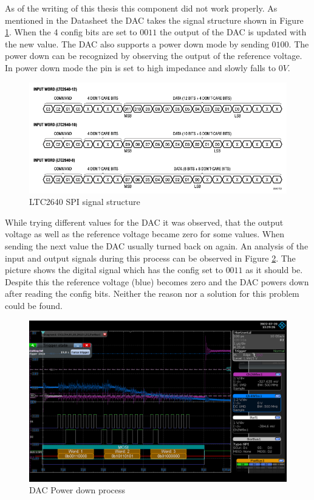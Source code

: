As of the writing of this thesis this component did not work properly. As mentioned in the Datasheet the DAC takes the signal structure shown in Figure \ref{fig:meas:circ:dac_spi}. When the 4 config bits are set to $0011$ the output of the DAC is updated with the new value. The DAC also supports a power down mode by sending $0100$. The power down can be recognized by observing the output of the reference voltage. In power down mode the pin is set to high impedance and slowly falls to $0V$.\cite{linear_technology_ltc2640_2017}
%
\begin{figure}
  \centering
  \includegraphics[width=\textwidth]{src/assets/pictures/measurements/dac_bit_structure.png}
  \caption{LTC2640 SPI signal structure\cite{linear_technology_ltc2640_2017}}\label{fig:meas:circ:dac_spi}
\end{figure}
\p
While trying different values for the DAC it was observed, that the output voltage as well as the reference voltage became zero for some values. When sending the next value the DAC usually turned back on again. An analysis of the input and output signals during this process can be observed in Figure \ref{fig:meas:circ:dac_power_down}.\p
The picture shows the digital signal which has the config set to $0011$ as it should be. Despite this the reference voltage (blue) becomes zero and the DAC powers down after reading the config bits. Neither the reason nor a solution for this problem could be found.
%
\begin{figure}
  \centering
  \includegraphics[height=\largeheight]{src/assets/pictures/measurements/dac_power_down.png}
  \caption{DAC Power down process}\label{fig:meas:circ:dac_power_down}
\end{figure}